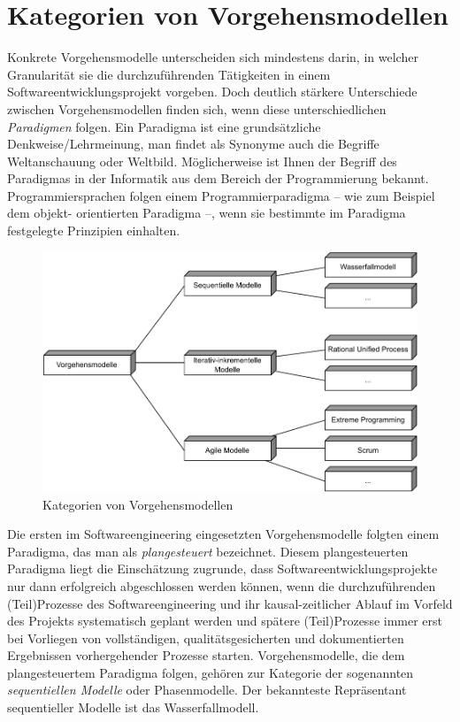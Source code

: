\section{Kategorien von Vorgehensmodellen}
\label{sec:Kap-2.2}

Konkrete Vorgehensmodelle unterscheiden sich mindestens darin, in welcher Granularität sie die durchzuführenden Tätigkeiten in einem Software\-entwicklungs\-projekt vorgeben. Doch deutlich stärkere Unterschiede zwischen Vorgehensmodellen finden sich, wenn diese unterschiedlichen \textit{Paradigmen} folgen.
Ein Paradigma ist eine grundsätzliche Denkweise/Lehrmeinung, man findet als Synonyme auch die Begriffe Weltanschauung oder Weltbild. Möglicherweise ist Ihnen der Begriff des Paradigmas in der Informatik aus dem Bereich der Programmierung bekannt. Programmier\-sprachen folgen einem Programmierparadigma -- wie zum Beispiel dem objekt-
\linebreak %
orientierten Paradigma --, wenn sie bestimmte im Paradigma festgelegte \mbox{Prinzipien} einhalten.

\begin{figure}[h!]
	\centering
	\includegraphics[scale=0.9]{Bilder/Kapitel-2/vorgehensmodelle.pdf}
	\caption{Kategorien von Vorgehensmodellen}
	\label{fig:vorgehensmodelle_komplett}
\end{figure}

Die ersten im Softwareengineering eingesetzten Vorgehensmodelle folgten einem Paradigma, das man als \textit{plangesteuert} bezeichnet. Diesem plangesteuerten Paradigma liegt die Einschätzung zugrunde, dass Softwareentwicklungsprojekte nur dann erfolgreich abgeschlossen werden können, wenn die durchzuführenden (Teil)Prozesse des Softwareengineering und ihr kausal-zeitlicher Ablauf im Vorfeld des Projekts systematisch geplant werden und spätere (Teil)Prozesse immer erst bei Vorliegen von vollständigen, qualitätsgesicherten und dokumentierten Ergebnissen vorhergehender Prozesse starten. Vorgehensmodelle, die dem plangesteuertem Paradigma folgen, gehören zur Kategorie der sogenannten \textit{sequentiellen Modelle} 
oder Phasenmodelle. Der bekannteste Repräsentant sequentieller Modelle ist das Wasserfallmodell.

